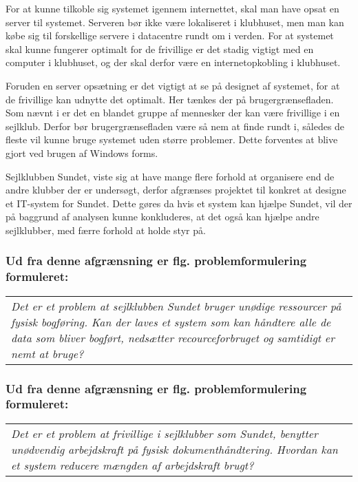 For at kunne tilkoble sig systemet igennem internettet, skal man have opsat en server til systemet. Serveren bør ikke være lokaliseret i klubhuset, men man kan købe sig til forskellige servere i datacentre rundt om i verden. For at systemet skal kunne fungerer optimalt for de frivillige er det stadig vigtigt med en computer i klubhuset, og der skal derfor være en internetopkobling i klubhuset.

Foruden en server opsætning er det vigtigt at se på designet af systemet, for at de frivillige kan udnytte det optimalt. Her tænkes der på brugergrænsefladen. Som nævnt i  er det en blandet gruppe af mennesker der kan være frivillige i en sejlklub. Derfor bør brugergrænsefladen være så nem at finde rundt i, således de fleste vil kunne bruge systemet uden større problemer. Dette forventes at blive gjort ved brugen af Windows forms.

Sejlklubben Sundet, viste sig at have mange flere forhold at organisere end de andre klubber der er undersøgt, derfor afgrænses projektet til konkret at designe et IT-system for Sundet. Dette gøres da hvis et system kan hjælpe Sundet, vil der på baggrund af analysen kunne konkluderes, at det også kan hjælpe andre sejlklubber, med færre forhold at holde styr på. 

\subsubsection*{Ud fra denne afgrænsning er flg. problemformulering formuleret:}
\begin{center}
\begin{tabular}{|p{14cm}|}
\textit{Det er et problem at sejlklubben Sundet bruger unødige ressourcer på fysisk bogføring. Kan der laves et system som kan håndtere alle de data som bliver bogført, nedsætter recourceforbruget og samtidigt er nemt at bruge? }
\end{tabular}
\end{center}
\subsubsection*{Ud fra denne afgrænsning er flg. problemformulering formuleret:}
\begin{center}
\begin{tabular}{|p{14cm}|}
\textit{Det er et problem at frivillige i sejlklubber som Sundet, benytter unødvendig arbejdskraft på fysisk dokumenthåndtering. Hvordan kan et system reducere mængden af arbejdskraft brugt? }
\end{tabular}
\end{center}


